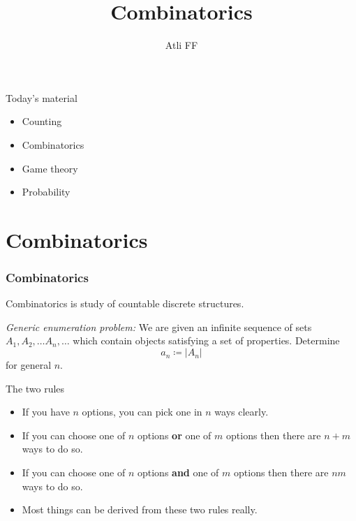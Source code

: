 \documentclass{beamer}
\title{Combinatorics}
\author{Atli FF}
\institute{\href{http://ru.is/td}{School of Computer Science} \\[2pt] \href{http://ru.is}{Reykjavík University}}
\begin{document}
\maketitle

\begin{frame}[plain]{Today's material}
    \vspace{22pt}
    \begin{itemize}
        \item Counting
        \item Combinatorics
        \item Game theory
        \item Probability
    \end{itemize}
\end{frame}

\section*{Combinatorics}

\begin{frame}[plain]
  \frametitle{Combinatorics}
  \vspace{30pt}
  Combinatorics is study of countable discrete structures.

  \vspace{10pt}
  \emph{Generic enumeration problem: } We are given an infinite sequence of
  sets $A_1, A_2, \ldots A_n, \ldots$ which contain objects satisfying a set of
  properties. Determine 
  \[
    a_n \coloneqq \lvert A_n \rvert
  \]
  for general $n$.
\end{frame}

\begin{frame}[plain]{The two rules}

\begin{itemize}

\item If you have $n$ options, you can pick one in $n$ ways clearly.

\item If you can choose one of $n$ options \textbf{or} one of $m$ options then there are $n + m$ ways to do so.

\item If you can choose one of $n$ options \textbf{and} one of $m$ options then there are $nm$ ways to do so.

\item Most things can be derived from these two rules really.

\end{itemize}

\end{frame}
\end{document}
